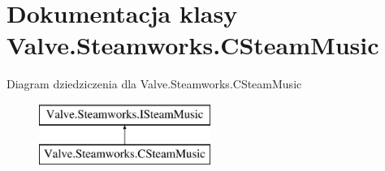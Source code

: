 \hypertarget{class_valve_1_1_steamworks_1_1_c_steam_music}{}\section{Dokumentacja klasy Valve.\+Steamworks.\+C\+Steam\+Music}
\label{class_valve_1_1_steamworks_1_1_c_steam_music}
Diagram dziedziczenia dla Valve.\+Steamworks.\+C\+Steam\+Music\begin{figure}[H]
\begin{center}
\leavevmode
\includegraphics[height=2.000000cm]{class_valve_1_1_steamworks_1_1_c_steam_music}
\end{center}
\end{figure}

